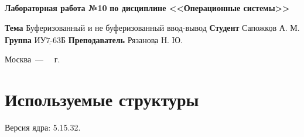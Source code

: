 \documentclass[a4paper,14pt]{extarticle}
\begin{document}
\begin{center}
	\noindent\begin{minipage}{1.3\textwidth}\centering
	\Large\textbf{    Лабораторная работа №10}\newline
	\textbf{по дисциплине <<Операционные системы>>}\newline\newline\newline
	\end{minipage}
\end{center}

\noindent\textbf{Тема} $\underline{\text{Буферизованный и не буферизованный ввод-вывод}}$\newline\newline
\noindent\textbf{Студент} $\underline{\text{Сапожков А. М.}}$\newline\newline
\noindent\textbf{Группа} $\underline{\text{ИУ7-63Б}}$\newline\newline
\noindent\textbf{Преподаватель} $\underline{\text{Рязанова Н. Ю.}}$\newline

\begin{center}
	\vfill
	Москва~---~\the\year
~г.
\end{center}
\clearpage



\section*{Используемые структуры}

Версия ядра: 5.15.32.
\end{document}
